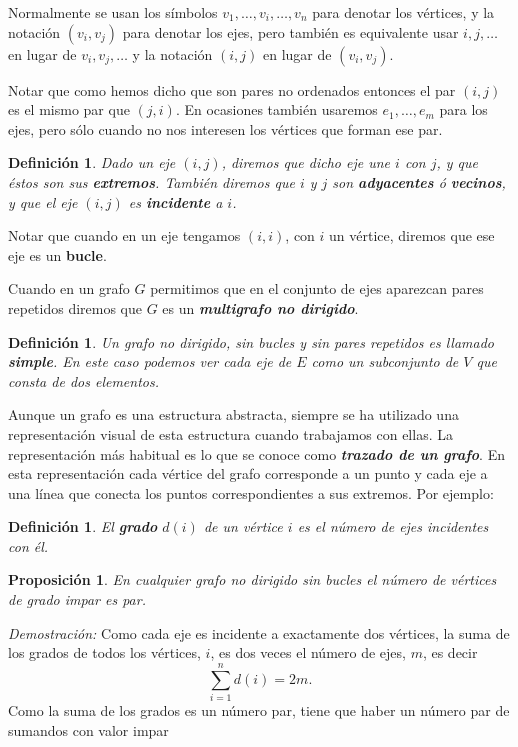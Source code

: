 \documentclass[12pt]{article}
\newtheorem{proposition}[theorem]{Proposición}
\newtheorem{definition}[theorem]{Definición}
\begin{document}
Normalmente se usan los símbolos $v_1, \ldots, v_i, \ldots, v_n$ para denotar los vértices, y la notación $(v_i, v_j)$ para denotar los ejes, pero también es equivalente usar $i,j, \ldots$ en lugar de $v_i, v_j, \ldots$ y la notación $(i,j)$ en lugar de $(v_i,v_j)$. 

Notar que como hemos dicho que son pares no ordenados entonces el par $(i,j)$ es el mismo par que $(j,i)$. En ocasiones también usaremos $e_1, \ldots, e_m$ para los ejes, pero sólo cuando no nos interesen los vértices que forman ese par. 

\begin{definition} Dado un eje $(i,j)$, diremos que dicho eje une $i$ con $j$, y que éstos son sus \textbf{extremos}. También diremos que $i$ y $j$ son \textbf{adyacentes} ó \textbf{vecinos}, y que el eje $(i,j)$ es \textbf{incidente} a $i$.
\end{definition} 

Notar que cuando en un eje tengamos $(i,i)$, con $i$ un vértice, diremos que ese eje es un \textbf{bucle}. 

Cuando en un grafo $G$ permitimos que en el conjunto de ejes aparezcan pares repetidos diremos que $G$ es un \textbf{\textit{multigrafo no dirigido}}.

\begin{definition}Un grafo no dirigido, sin bucles y sin pares repetidos es llamado \textbf{simple}. En este caso podemos ver cada eje de $E$ como un subconjunto de $V$ que consta de dos elementos.
\end{definition}

Aunque un grafo es una estructura abstracta, siempre se ha utilizado una representación visual de esta estructura cuando trabajamos con ellas. La representación más habitual es lo que se conoce como \textbf{\textit{trazado de un grafo}}. En esta representación cada vértice del grafo corresponde a un punto y cada eje a una línea que conecta los puntos correspondientes a sus extremos. Por ejemplo:



\begin{definition}El \textbf{grado} $d(i)$ de un vértice $i$ es el número de ejes incidentes con él.
\end{definition} 

\begin{proposition}En cualquier grafo no dirigido sin bucles el número de vértices de grado impar es par.
\end{proposition}
\emph{Demostración: }Como cada eje es incidente a exactamente dos vértices, la suma de los grados de todos los vértices, $i$, es dos veces el número de ejes, $m$,  es decir $$\sum^n_{i=1}d(i) = 2m.$$ Como la suma de los grados es un número par, tiene que haber un número par de sumandos con valor impar
\end{document}
